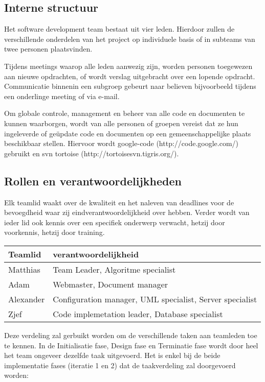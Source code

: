 \documentclass{article}
\begin{document}
\subsection{Interne structuur}

Het software development team bestaat uit vier leden. Hierdoor zullen de verschillende onderdelen van het project op individuele basis of in subteams  van twee personen plaatsvinden.

Tijdens meetings waarop alle leden aanwezig zijn, worden personen toegewezen aan nieuwe opdrachten, of wordt verslag uitgebracht over een lopende opdracht.
Communicatie binnenin een subgroep gebeurt naar believen bijvoorbeeld tijdens een onderlinge meeting of via e-mail.

Om globale controle, management en beheer van alle code en documenten te kunnen waarborgen, wordt van alle personen of groepen vereist dat ze hun ingeleverde of ge\"{u}pdate code en documenten op een gemeenschappelijke plaats beschikbaar stellen.
Hiervoor wordt google-code (http://code.google.com/) gebruikt en svn tortoise (http://tortoisesvn.tigris.org/).

\subsection{Rollen en verantwoordelijkheden}

Elk teamlid waakt over de kwaliteit en het naleven van deadlines voor de bevoegdheid waar zij eindverantwoordelijkheid over hebben.
Verder wordt van ieder lid ook kennis over een specifiek onderwerp verwacht, hetzij door voorkennis, hetzij door training.

\begin{center}
\begin{tabular}[t]{|l|l|}
\hline
Teamlid & verantwoordelijkheid \\
\hline
\hline
Matthias & Team Leader, Algoritme specialist \\
\hline
Adam & Webmaster, Document manager \\
\hline
Alexander & Configuration manager, UML specialist, Server specialist \\
\hline
Zjef & Code implemetation leader, Database specialist  \\
\hline
\end{tabular}
\end{center}

Deze verdeling zal gerbuikt worden om de verschillende taken aan teamleden toe te kennen. In de Initialisatie fase, Design fase en Terminatie fase wordt door heel het team ongeveer dezelfde taak uitgevoerd. Het is enkel bij de beide implementatie fases (iteratie 1 en 2) dat de taakverdeling zal doorgevoerd worden: \\[3mm]
\end{document}
